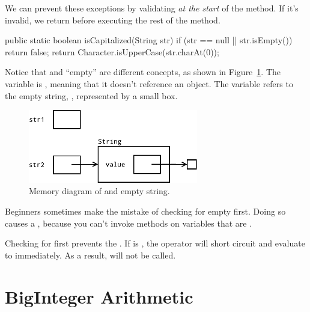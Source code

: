 We can prevent these exceptions by validating  {\em at the start} of the method.
If it's invalid, we return before executing the rest of the method.

\begin{code}
public static boolean isCapitalized(String str) {
    if (str == null || str.isEmpty()) {
        return false;
    }
    return Character.isUpperCase(str.charAt(0));
}
\end{code}

Notice that  and ``empty'' are different concepts, as shown in Figure~\ref{fig.nullempty}.
The variable  is , meaning that it doesn't reference an object.
The variable  refers to the empty string, , represented by a small box.

\begin{figure}[!ht]
\begin{center}
\includegraphics[width=210pt]{figs/nullempty.pdf}
\caption{Memory diagram of  and empty string.}
\label{fig.nullempty}
\end{center}
\end{figure}

Beginners sometimes make the mistake of checking for empty first.
Doing so causes a , because you can't invoke methods on variables that are .

\begin{code}
if (str.isEmpty() || str == null) {    // wrong!
\end{code}


Checking for  first prevents the .
If  is , the \java{||} operator will short circuit and evaluate to  immediately.
As a result,  will not be called.



\section{BigInteger Arithmetic}

